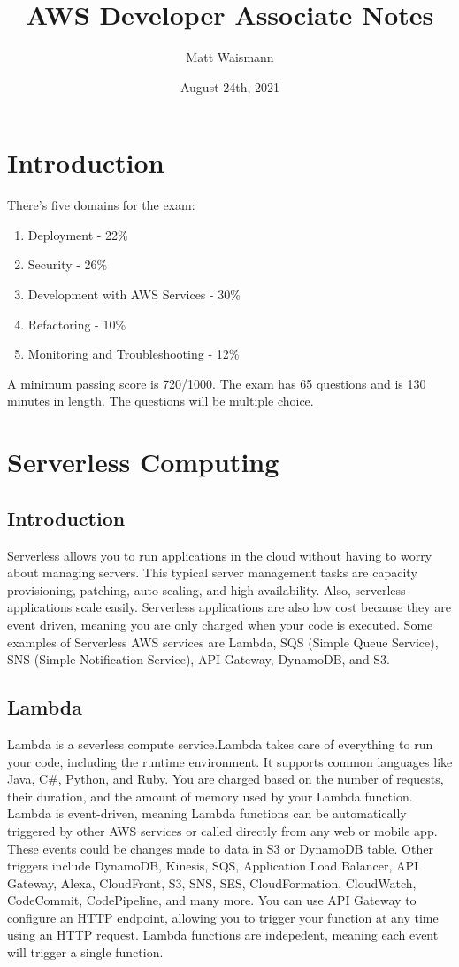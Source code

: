 \documentclass{article}%
\title{AWS Developer Associate Notes}
\date{August 24th, 2021}
\author{Matt Waismann}
\begin{document}
\maketitle
\section{Introduction}
There's five domains for the exam:
\begin{enumerate}
    \item Deployment - 22\%
    \item Security - 26\%
    \item Development with AWS Services - 30\%
    \item Refactoring - 10\%
    \item Monitoring and Troubleshooting - 12\%
\end{enumerate}

A minimum passing score is 720/1000. The exam has 65 questions and is 130 minutes in length. The questions will be multiple choice.

\section{Serverless Computing}
\subsection{Introduction} Serverless allows you to run applications in the cloud without having to worry about managing servers. This typical server management tasks are capacity provisioning, patching, auto scaling, and high availability. Also, serverless applications scale easily.
Serverless applications are also low cost because they are event driven, meaning you are only charged when your code is executed.
Some examples of Serverless AWS services are Lambda, SQS (Simple Queue Service), SNS (Simple Notification Service), API Gateway, DynamoDB, and S3. 
\subsection{Lambda}
Lambda is a severless compute service.Lambda takes care of everything to run your code, including the runtime environment. It supports common languages like Java, C\#, Python, and Ruby. You are charged based on the number of requests, their duration, and the amount of memory used by your Lambda function. Lambda is event-driven, meaning Lambda functions can be automatically triggered by other AWS services or called directly from any web or mobile app. These events could be changes made to data in S3 or DynamoDB table. Other triggers include DynamoDB, Kinesis, SQS, Application Load Balancer, API Gateway, Alexa, CloudFront, S3, SNS, SES, CloudFormation, CloudWatch, CodeCommit, CodePipeline, and many more. You can use API Gateway to configure an HTTP endpoint, allowing you to trigger your function at any time using an HTTP request. 
Lambda functions are indepedent, meaning each event will trigger a single function. 
\end{document}
